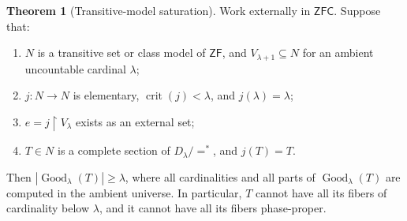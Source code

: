 \documentclass[11pt,letterpaper]{article}
\theoremstyle{definition}
\newtheorem{theorem}[definition]{Theorem}
\newcommand{\ZFC}{\mathsf{ZFC}}
\newcommand{\ZF}{\mathsf{ZF}}
\newcommand{\crit}{\operatorname{crit}}
\newcommand{\restr}{\mathbin{\upharpoonright}}
\numberwithin{equation}{section}
\newcommand{\Good}{\operatorname{Good}}
\begin{document}
\begin{theorem}[Transitive-model saturation]\label{thm:transitive}
Work externally in $\ZFC$. Suppose that:
\begin{enumerate}
\item $N$ is a transitive set or class model of $\ZF$, and $V_{\lambda+1}\subseteq N$ for an ambient uncountable cardinal $\lambda$;
\item $j:N\to N$ is elementary, $\crit(j)<\lambda$, and $j(\lambda)=\lambda$;
\item $e=j\restr V_\lambda$ exists as an external set;
\item $T\in N$ is a complete section of $D_\lambda/{=^{*}}$, and $j(T)=T$.
\end{enumerate}
Then $|\Good_\lambda(T)|\ge\lambda$, where all cardinalities and all parts of $\Good_\lambda(T)$ are computed in the ambient universe. In particular, $T$ cannot have all its fibers of cardinality below $\lambda$, and it cannot have all its fibers phase-proper.
\end{theorem}
\end{document}
